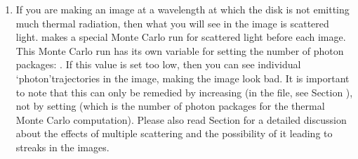 \documentclass[letterpaper,10pt,english]{sphinxmanual}
\begin{document}
\begin{enumerate}
\begin{enumerate}
\item {} 
 If you are making an
image at a wavelength at which the disk is not emitting much thermal
radiation, then what you will see in the image is scattered light.
 makes a special Monte Carlo run for scattered light before
each image. This Monte Carlo run has its own variable for setting the
number of photon packages: . If this value is set too low,
then you can see individual ‘photon’\sphinxhyphen{}trajectories in the image, making the
image look bad. It is important to note that this can only be remedied by
increasing  (in the  file, see Section
{\hyperref[\detokenize{dustradtrans:sec-scat-monte-carlo}]{}}), not by setting  (which is the
number of photon packages for the thermal Monte Carlo computation). Please
also read Section {\hyperref[\detokenize{dustradtrans:sec-single-multiple-scattering}]{}} for a detailed
discussion about the effects of multiple scattering and the possibility of
it leading to streaks in the images.

\end{enumerate}


\end{enumerate}
\end{document}
